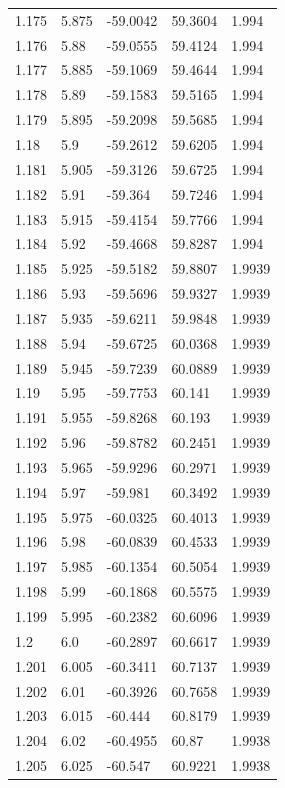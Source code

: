 \begin{tabular}{lllll}
1.175 & 5.875 & -59.0042 & 59.3604 & 1.994 \\
1.176 & 5.88 & -59.0555 & 59.4124 & 1.994 \\
1.177 & 5.885 & -59.1069 & 59.4644 & 1.994 \\
1.178 & 5.89 & -59.1583 & 59.5165 & 1.994 \\
1.179 & 5.895 & -59.2098 & 59.5685 & 1.994 \\
1.18 & 5.9 & -59.2612 & 59.6205 & 1.994 \\
1.181 & 5.905 & -59.3126 & 59.6725 & 1.994 \\
1.182 & 5.91 & -59.364 & 59.7246 & 1.994 \\
1.183 & 5.915 & -59.4154 & 59.7766 & 1.994 \\
1.184 & 5.92 & -59.4668 & 59.8287 & 1.994 \\
1.185 & 5.925 & -59.5182 & 59.8807 & 1.9939 \\
1.186 & 5.93 & -59.5696 & 59.9327 & 1.9939 \\
1.187 & 5.935 & -59.6211 & 59.9848 & 1.9939 \\
1.188 & 5.94 & -59.6725 & 60.0368 & 1.9939 \\
1.189 & 5.945 & -59.7239 & 60.0889 & 1.9939 \\
1.19 & 5.95 & -59.7753 & 60.141 & 1.9939 \\
1.191 & 5.955 & -59.8268 & 60.193 & 1.9939 \\
1.192 & 5.96 & -59.8782 & 60.2451 & 1.9939 \\
1.193 & 5.965 & -59.9296 & 60.2971 & 1.9939 \\
1.194 & 5.97 & -59.981 & 60.3492 & 1.9939 \\
1.195 & 5.975 & -60.0325 & 60.4013 & 1.9939 \\
1.196 & 5.98 & -60.0839 & 60.4533 & 1.9939 \\
1.197 & 5.985 & -60.1354 & 60.5054 & 1.9939 \\
1.198 & 5.99 & -60.1868 & 60.5575 & 1.9939 \\
1.199 & 5.995 & -60.2382 & 60.6096 & 1.9939 \\
1.2 & 6.0 & -60.2897 & 60.6617 & 1.9939 \\
1.201 & 6.005 & -60.3411 & 60.7137 & 1.9939 \\
1.202 & 6.01 & -60.3926 & 60.7658 & 1.9939 \\
1.203 & 6.015 & -60.444 & 60.8179 & 1.9939 \\
1.204 & 6.02 & -60.4955 & 60.87 & 1.9938 \\
1.205 & 6.025 & -60.547 & 60.9221 & 1.9938 \\

\end{tabular}

